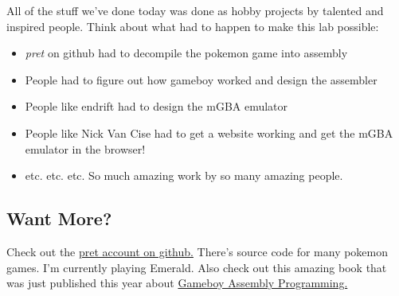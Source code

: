 \documentclass[12pt,a4]{article}
\begin{document}
All of the stuff we've done today was done as hobby projects by talented and inspired people. Think about what had to happen to make this lab possible:
\begin{itemize}
    \item \textit{pret} on github had to decompile the pokemon game into assembly
    \item People had to figure out how gameboy worked and design the assembler 
    \item People like endrift had to design the mGBA emulator
    \item People like Nick Van Cise had to get a website working and get the mGBA emulator in the browser!
    \item etc. etc. etc. So much amazing work by so many amazing people.
\end{itemize}


\subsection{Want More?}
Check out the \href{https://github.com/pret}{pret account on github.} There's source code for many pokemon games. I'm currently playing Emerald. Also check out this amazing book that was just published this year about \href{https://nostarch.com/game-boy-coding-adventure}{Gameboy Assembly Programming.}
\end{document}
